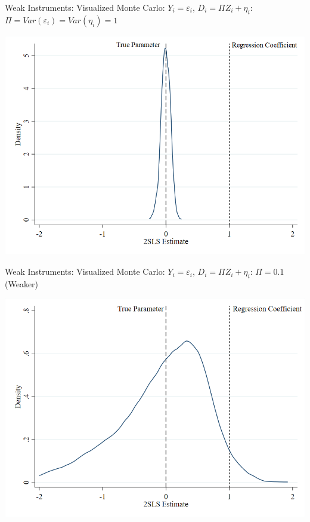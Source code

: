 \documentclass{beamer}
\begin{document}
\begin{frame}{Weak Instruments: Visualized}
Monte Carlo: $Y_i=\varepsilon_i$, $D_i=\Pi Z_i+\eta_i$: $\Pi=Var(\varepsilon_i)=Var(\eta_i)=1$
\begin{center}
\includegraphics[scale=0.45]{./lecture_includes/strongpi.png}
\end{center}

\end{frame}

\begin{frame}{Weak Instruments: Visualized}
Monte Carlo: $Y_i=\varepsilon_i$, $D_i=\Pi Z_i+\eta_i$: $\Pi=0.1$ (Weaker)
\begin{center}
\includegraphics[scale=0.35]{./lecture_includes/medpi.png}
\end{center}

\end{frame}
\end{document}

